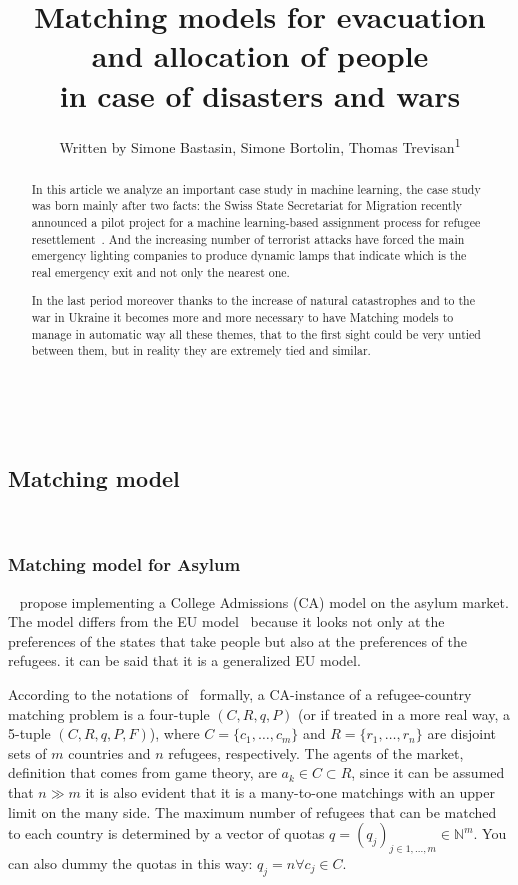 \documentclass[letterpaper]{article} %
\title{Matching models for evacuation and allocation of people\\in case of disasters and wars}
\author{
    Written by Simone Bastasin, Simone Bortolin, Thomas Trevisan\textsuperscript{\rm 1}
    \\
}
\begin{document}
    \maketitle

    \begin{abstract}
        In this article we analyze an important case study in machine learning, the case study was born mainly after two facts:
        the Swiss State Secretariat for Migration recently announced a pilot project for a machine
        learning-based assignment process for refugee resettlement~\citet{olbergml}.
        And the increasing number of terrorist attacks have forced the main emergency lighting companies to produce dynamic lamps
        that indicate which is the real emergency exit and not only the nearest one.

        In the last period moreover thanks to the increase of natural catastrophes and to the war in Ukraine it becomes more and more
        necessary to have Matching models to manage in automatic way all these themes, that to the first sight could be very untied
        between them, but in reality they are extremely tied and similar.
    \end{abstract}

    \noindent%
    ~\citet{olbergml,basshuysen,delacretaz_2020,andersson}

    \subsection{Matching model}\label{matching-model}%
    ~\citet{olbergml,basshuysen,delacretaz_2020}

    \subsubsection{Matching model for Asylum}\label{matching-model-for-asylum}%
    ~\citet{olbergml,basshuysen,delacretaz_2020,fernandez} propose implementing a College Admissions (CA)
    model on the asylum market.
    The model differs from the EU model~\citet{basshuysen} because it looks not only at the preferences of the states that
    take people but also at the preferences of the refugees.
    it can be said that it is a generalized EU model.

    According to the notations of~\citet{salles} formally, a CA-instance of a refugee-country matching problem is a
    four-tuple \((C, R, q, P)\) (or if treated in a more real way, a 5-tuple \((C, R, q, P, F)\)), where
    \(C = \{c_1, \dots, c_m\}\) and \(R = \{r_1, \dots,r_n\}\) are disjoint sets of \(m\) countries and \(n\) refugees,
    respectively.
    The agents of the market, definition that comes from game theory, are \(a_k \in C\subset R\),
    since it can be assumed that \(n \gg m\) it is also evident that it is a many-to-one matchings with an upper limit
    on the many side.
    The maximum number of refugees that can be matched to
    each country is determined by a vector of quotas \(q = (q_j)_{j\in {1,...,m}} \in \mathbb{N}^m\).
    You can also dummy the quotas in this way:  \(q_j = n \forall c_j \in C\).
\end{document}
